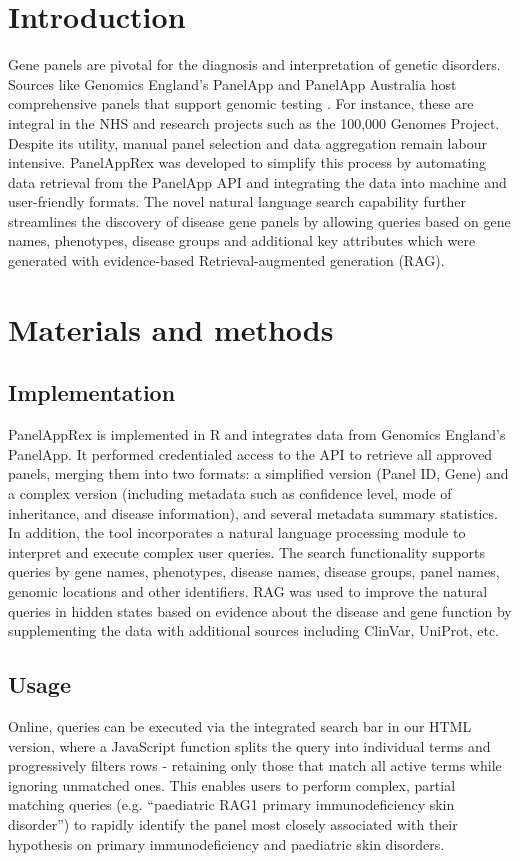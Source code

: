 \section{Introduction}
\noindent
Gene panels are pivotal for the diagnosis and interpretation of genetic disorders. Sources like Genomics England’s PanelApp and PanelApp Australia host comprehensive panels that support genomic testing \cite{martin_panelapp_2019}. For instance, these are integral in the NHS and research projects such as the 100,000 Genomes Project. Despite its utility, manual panel selection and data aggregation remain labour intensive. PanelAppRex was developed to simplify this process by automating data retrieval from the PanelApp API and integrating the data into machine and user-friendly formats. The novel natural language search capability further streamlines the discovery of disease gene panels by allowing queries based on gene names, phenotypes, disease groups and additional key attributes which were generated with evidence-based Retrieval-augmented generation (RAG).


\section{Materials and methods}
\subsection{Implementation}
\noindent
PanelAppRex is implemented in R and integrates data from Genomics England’s PanelApp. It performed credentialed access to the API to retrieve all approved panels, merging them into two formats: a simplified version (Panel ID, Gene) and a complex version (including metadata such as confidence level, mode of inheritance, and disease information), and several metadata summary statistics. In addition, the tool incorporates a natural language processing module to interpret and execute complex user queries. The search functionality supports queries by gene names, phenotypes, disease names, disease groups, panel names, genomic locations and other identifiers. 
RAG was used to improve the natural queries in hidden states based on evidence about the disease and gene function by supplementing the data with additional sources including ClinVar, UniProt, etc. 

\subsection{Usage}
\noindent
Online, queries can be executed via the integrated search bar in our HTML version, where a JavaScript function splits the query into individual terms and progressively filters rows - retaining only those that match all active terms while ignoring unmatched ones. This enables users to perform complex, partial matching queries (e.g. ``paediatric RAG1 primary immunodeficiency skin disorder'') to rapidly identify the panel most closely associated with their hypothesis on primary immunodeficiency and paediatric skin disorders.

